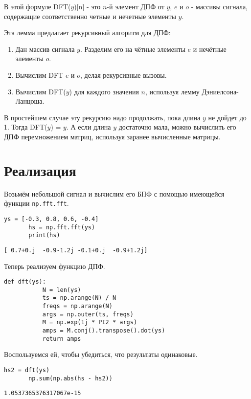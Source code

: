 \documentclass[a4paper,12pt]{report}
\begin{document}
    В этой формуле DFT($y$)[n] - это $n$-й элемент ДПФ от $y$, $e$ и $o$ - массивы сигнала, содержащие соответственно четные и нечетные элементы $y$.
    
    Эта лемма предлагает рекурсивный алгоритм для ДПФ:
\begin{enumerate} 
  \item Дан массив сигнала $y$. Разделим его на чётные элементы $e$ и нечётные элементы $o$. 
  \item Вычислим DFT $e$ и $o$, делая рекурсивные вызовы.
  \item Вычислим DFT($y$) для каждого значения $n$, используя лемму Дэниелсона-Ланцоша. 
\end{enumerate}

    В простейшем случае эту рекурсию надо продолжать, пока длина $y$ не дойдет до 1. Тогда DFT($y$) = $y$. А если длина $y$ достаточно мала, можно вычислить его ДПФ перемножением матриц, используя заранее вычисленные матрицы.
    
\section{Реализация}
    Возьмём небольшой сигнал и вычислим его БПФ с помощью имеющейся функции \texttt{np.fft.fft}.
\begin{lstlisting}[caption=Вычисление БПФ с помощью np.fft.fft]
       ys = [-0.3, 0.8, 0.6, -0.4]
       hs = np.fft.fft(ys)
       print(hs)
\end{lstlisting}  
\begin{lstlisting}[caption=Полученные результаты]
       [ 0.7+0.j  -0.9-1.2j -0.1+0.j  -0.9+1.2j]
\end{lstlisting}

    Теперь реализуем функцию ДПФ.
\begin{lstlisting}[caption=Функция dft]
       def dft(ys):
           N = len(ys)
           ts = np.arange(N) / N
           freqs = np.arange(N)
           args = np.outer(ts, freqs)
           M = np.exp(1j * PI2 * args)
           amps = M.conj().transpose().dot(ys)
           return amps
\end{lstlisting} 
    
    Воспользуемся ей, чтобы убедиться, что результаты одинаковые. 
\begin{lstlisting}[caption=Применение функции ДПФ]
       hs2 = dft(ys)
       np.sum(np.abs(hs - hs2))
\end{lstlisting}  
\begin{lstlisting}[caption=Полученные результаты]
       1.0537365376317067e-15
\end{lstlisting}
\end{document}
